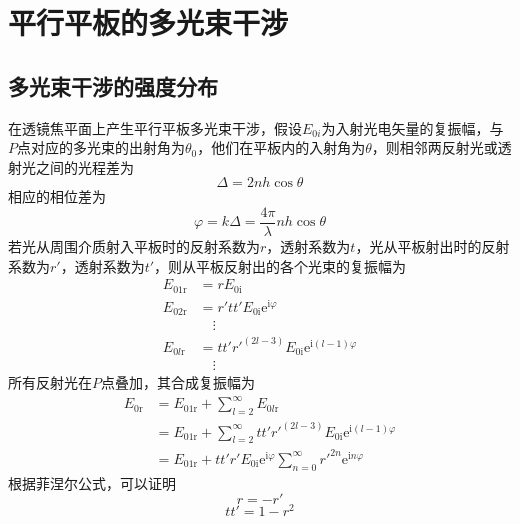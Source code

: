 \documentclass[cn,10pt,chinesefont=founder,math=mtpro2,cite=super,toc=onecol,twoside]{elegantbook}
\begin{document}
\section{平行平板的多光束干涉}

\subsection{多光束干涉的强度分布}
在透镜焦平面上产生平行平板多光束干涉，假设$E_{0i}$为入射光电矢量的复振幅，与$P$点对应的多光束的出射角为$\theta_0$，他们在平板内的入射角为$\theta$，则相邻两反射光或透射光之间的光程差为
\begin{equation}
\varDelta=2nh\cos\theta
\end{equation}
相应的相位差为
\begin{equation}
\varphi=k\varDelta=\frac{4\pi}{\lambda}nh\cos\theta
\label{eq:phase-difference-between-two-beams}
\end{equation}
若光从周围介质射入平板时的反射系数为$r$，透射系数为$t$，光从平板射出时的反射系数为$r'$，透射系数为$t'$，则从平板反射出的各个光束的复振幅为
\begin{equation}
\begin{aligned}
E_{01\mathrm{r}}&=rE_{0\mathrm{i}}\\
E_{02\mathrm{r}}&=r'tt'E_{0\mathrm{i}}\mathrm{e}^{\mathrm{i}\varphi}\\
&\quad\vdots\\
E_{0l\mathrm{r}}&=tt'r'^{(2l-3)}E_{0\mathrm{i}}\mathrm{e}^{\mathrm{i}(l-1)\varphi}\\
&\quad\vdots
\end{aligned}
\end{equation}
所有反射光在$P$点叠加，其合成复振幅为
\begin{equation}
\begin{aligned}
E_{0\mathrm{r}}&=E_{01\mathrm{r}}+\sum_{l=2}^{\infty}E_{0l\mathrm{r}}\\
&=E_{01\mathrm{r}}+\sum_{l=2}^{\infty}tt'r'^{(2l-3)}E_{0\mathrm{i}}\mathrm{e}^{\mathrm{i}(l-1)\varphi}\\
&=E_{01\mathrm{r}}+tt'r'E_{0\mathrm{i}}\mathrm{e}^{\mathrm{i}\varphi}\sum_{n=0}^{\infty}r'^{2n}\mathrm{e}^{\mathrm{i}n\varphi}
\end{aligned}
\end{equation}
根据菲涅尔公式，可以证明
\begin{equation}
r=-r'
\end{equation}
\begin{equation}
tt'=1-r^2
\end{equation}
\end{document}
